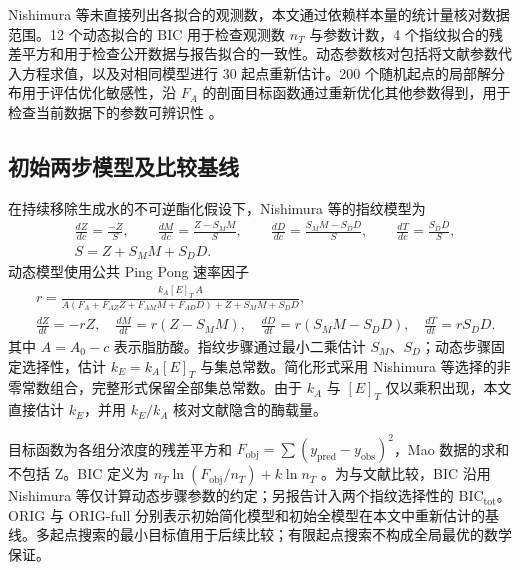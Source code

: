 Nishimura 等未直接列出各拟合的观测数，本文通过依赖样本量的统计量核对数据范围。12 个动态拟合的 BIC 用于检查观测数 $n_T$ 与参数计数，4 个指纹拟合的残差平方和用于检查公开数据与报告拟合的一致性。动态参数核对包括将文献参数代入方程求值，以及对相同模型进行 30 起点重新估计。200 个随机起点的局部解分布用于评估优化敏感性，沿 $F_A$ 的剖面目标函数通过重新优化其他参数得到，用于检查当前数据下的参数可辨识性 \cite{raue2009}。

\subsection{初始两步模型及比较基线}
在持续移除生成水的不可逆酯化假设下，Nishimura 等的指纹模型为 \cite{nishimura2026}
\begin{equation}
\begin{aligned}
&\frac{dZ}{dc}=\frac{-Z}{S},\qquad \frac{dM}{dc}=\frac{Z-S_MM}{S},\qquad \frac{dD}{dc}=\frac{S_MM-S_DD}{S},\qquad\frac{dT}{dc}=\frac{S_DD}{S},\\
&S=Z+S_MM+S_DD.
\end{aligned}\label{eq:fp}
\end{equation}
动态模型使用公共 Ping Pong 速率因子
\begin{equation}
\begin{aligned}
&r=\frac{k_A[E]_T\,A}{A(F_A+F_{AZ}Z+F_{AM}M+F_{AD}D)+Z+S_MM+S_DD},\\
&\frac{dZ}{dt}=-rZ,\quad \frac{dM}{dt}=r(Z-S_MM),\quad \frac{dD}{dt}=r(S_MM-S_DD),\quad \frac{dT}{dt}=rS_DD.
\end{aligned}\label{eq:dyn}
\end{equation}
其中 $A=A_0-c$ 表示脂肪酸。指纹步骤通过最小二乘估计 $S_M$、$S_D$；动态步骤固定选择性，估计 $k_E=k_A[E]_T$ 与集总常数。简化形式采用 Nishimura 等选择的非零常数组合，完整形式保留全部集总常数。由于 $k_A$ 与 $[E]_T$ 仅以乘积出现，本文直接估计 $k_E$，并用 $k_E/k_A$ 核对文献隐含的酶载量。

目标函数为各组分浓度的残差平方和 $F_\mathrm{obj}=\sum(y_\mathrm{pred}-y_\mathrm{obs})^2$，Mao 数据的求和不包括 Z。BIC 定义为 $n_T\ln(F_\mathrm{obj}/n_T)+k\ln n_T$ \cite{schwarz1978}。为与文献比较，BIC 沿用 Nishimura 等仅计算动态步骤参数的约定；另报告计入两个指纹选择性的 $\mathrm{BIC}_\mathrm{tot}$。ORIG 与 ORIG-full 分别表示初始简化模型和初始全模型在本文中重新估计的基线。多起点搜索的最小目标值用于后续比较；有限起点搜索不构成全局最优的数学保证。

